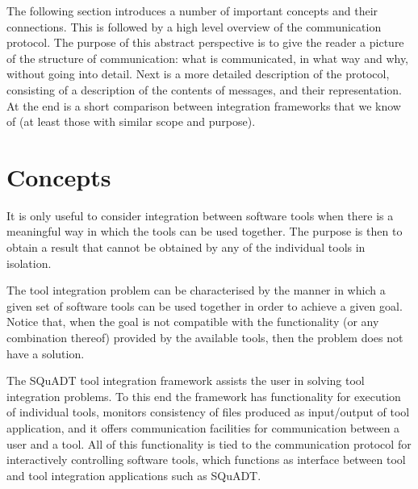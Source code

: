 \documentclass{article}
\newcommand{\squadt}{SQuADT\xspace}
\begin{document}
  The following section introduces a number of important concepts and their
  connections. This is followed by a high level overview of the communication
  protocol.  The purpose of this abstract perspective is to give the reader a
  picture of the structure of communication: what is communicated, in what way
  and why, without going into detail. Next is a more detailed description of
  the protocol, consisting of a description of the contents of messages, and
  their representation.  At the end is a short comparison between integration
  frameworks that we know of (at least those with similar scope and purpose).

 \section{Concepts}

   It is only useful to consider integration between software tools when there
   is a meaningful way in which the tools can be used together. The purpose is
   then to obtain a result that cannot be obtained by any of the individual
   tools in isolation.
   
   The tool integration problem can be characterised by the manner in which a
   given set of software tools can be used together in order to achieve a given
   goal. Notice that, when the goal is not compatible with the functionality
   (or any combination thereof) provided by the available tools, then the
   problem does not have a solution.
   
   The \squadt tool integration framework assists the user in solving tool
   integration problems. To this end the framework has functionality for
   execution of individual tools, monitors consistency of files produced as
   input/output of tool application, and it offers communication facilities for
   communication between a user and a tool. All of this functionality is tied
   to the communication protocol for interactively controlling software tools,
   which functions as interface between tool and tool integration applications
   such as \squadt.
   
 
\end{document}
